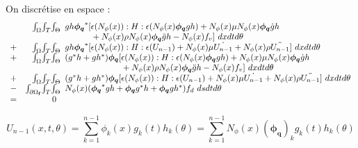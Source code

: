 On discrétise en espace :
\begin{equation}
\begin{array}{r r l}
	&\int_\Omega \! \int_T \! \int_\Theta \!\!\!&		
		gh\boldsymbol{\phi_q}^*[\epsilon (N_\phi(x)) : H : \epsilon (N_\phi(x)\boldsymbol{\phi_q} gh)
			+ N_\phi(x) \mu  N_\phi(x) \boldsymbol{\phi_q}  \dot{g}h
			\\ && \phantom{gh\boldsymbol{\phi_q}^*[ }
			+ N_\phi(x) \rho N_\phi(x) \boldsymbol{\phi_q} \ddot{g}h
			- N_\phi(x) f_v
			] ~dx dt d\theta
	\\
	+ &\int_\Omega \! \int_T \! \int_\Theta \!\!\!&		
		gh\boldsymbol{\phi_q}^*[\epsilon (N_\phi(x)) : H : \epsilon (U_{n-1})
			+ N_\phi(x) \mu \dot{U_{n-1}} 
			+ N_\phi(x) \rho \ddot{U_{n-1}}
			] ~dx dt d\theta
	\\
	+ &\int_\Omega \! \int_T \! \int_\Theta \!\!\!&		
		(g^*h + gh^*)\boldsymbol{\phi_q}[\epsilon (N_\phi(x)) : H : \epsilon (N_\phi(x) \boldsymbol{\phi_q}gh)
			+ N_\phi(x) \mu  N_\phi(x) \boldsymbol{\phi_q} \dot{g}h
			\\ && \phantom{(g^*h + gh^*)\boldsymbol{\phi_q}[ }
			 + N_\phi(x) \rho N_\phi(x) \boldsymbol{\phi_q} \ddot{g}h
			- N_\phi(x) f_v
			] ~dx dt d\theta
	\\
	+ &\int_\Omega \! \int_T \! \int_\Theta \!\!\!&		
		(g^*h + gh^*)\boldsymbol{\phi_q}[\epsilon (N_\phi(x)) : H : \epsilon (U_{n-1})
			+ N_\phi(x) \mu \dot{U_{n-1}}
			+ N_\phi(x) \rho \ddot{U_{n-1}}
			] ~dx dt d\theta
	\\
	- &\int_{\partial \Omega_\mathbf{f}} \! \int_T \! \int_\Theta \!\!\!&
		N_\phi(x)(\boldsymbol{\phi_q}^*gh + \boldsymbol{\phi_q} g^*h + \boldsymbol{\phi_q} gh^*) f_d  ~ds dt d\theta
	\\
	= &0& 
\end{array}
\end{equation}

\begin{equation}
U_{n-1}(x,t,\theta)
	 = \sum_{k=1}^{n-1} \phi_k(x) g_k(t)h_k(\theta)
	 = \sum_{k=1}^{n-1} N_\phi(x)(\boldsymbol{\phi_q})_k g_k(t)h_k(\theta)
\end{equation}

